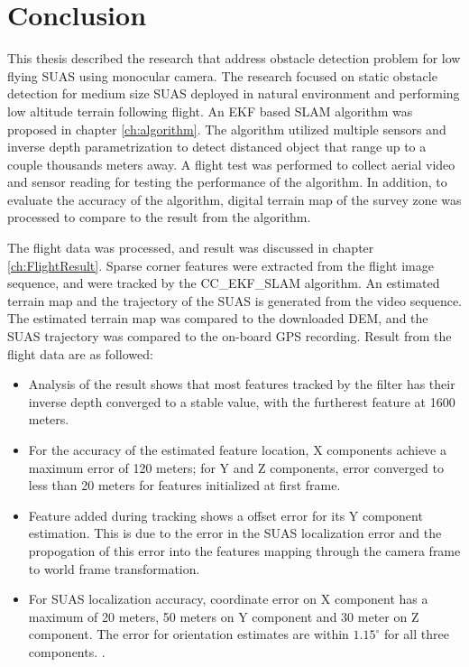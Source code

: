 \chapter{Conclusion}\label{ch:conclusion}

This thesis described the research that address obstacle
detection problem for low flying SUAS using monocular camera. The
research focused on static obstacle detection for medium size SUAS
deployed in natural environment and performing low altitude terrain
following flight.  An EKF based SLAM algorithm was
proposed in chapter \ref{ch:algorithm}. The algorithm utilized
multiple sensors and inverse depth parametrization to detect distanced
object that range up to a couple thousands meters away. A flight test
was performed to collect aerial video and sensor reading for testing
the performance of the algorithm. In addition, to evaluate the
accuracy of the algorithm, digital terrain map of the survey zone was
processed to compare to the result from the algorithm. 

The flight data was processed, and result was discussed in chapter
\ref{ch:FlightResult}. Sparse corner features were extracted from the
flight image sequence, and were tracked by the CC\_EKF\_SLAM
algorithm. An estimated terrain map and the trajectory of the SUAS is
generated from the video sequence. The estimated terrain map was
compared to the downloaded DEM, and the SUAS trajectory was compared
to the on-board GPS recording. Result from the flight data are as
followed:
\begin{itemize}
  \item Analysis of the result shows that most features tracked by the
  filter has their inverse depth converged to a stable value, with the
  furtherest feature at 1600 meters.
  \item For the accuracy of the estimated feature location, X
  components achieve a maximum error of 120 meters; for Y and Z
  components, error converged to less than 20 meters for features
  initialized at first frame.
  \item Feature added during tracking shows a offset error for its Y
  component estimation. This is due to the error in the SUAS
  localization error and the propogation of this error into the
  features mapping through the camera frame to world frame
  transformation.
  \item For SUAS localization accuracy, coordinate error on X
  component has a maximum of 20 meters, 50 meters on Y component and
  30 meter on Z component. The error for orientation estimates are
  within $1.15^\circ$ for all three components. .
\end{itemize}

